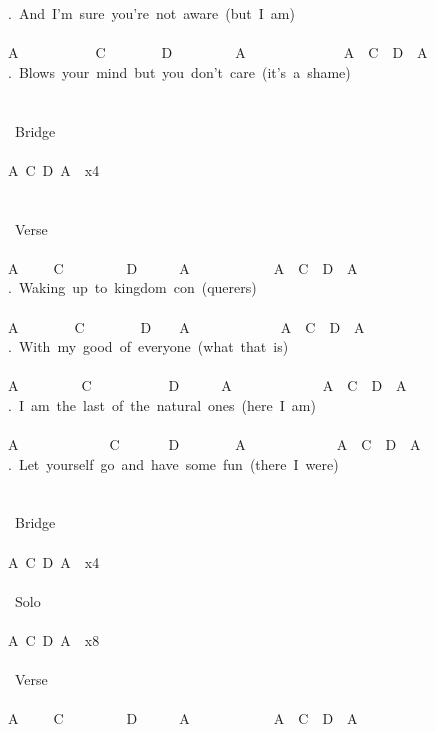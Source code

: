 {.\ And\ I'm\ sure\ you're\ not\ aware\ (but\ I\ am)\\
\\
A\ \ \ \ \ \ \ \ \ \ \ C\ \ \ \ \ \ \ \ D\ \ \ \ \ \ \ \ \ A\ \ \ \ \ \ \ \ \ \ \ \ \ \ A\ \ C\ \ D\ \ A\ \ \\
.\ Blows\ your\ mind\ but\ you\ don't\ care\ (it's\ a\ shame)\\
\\
\\
\lbrack\ Bridge\rbrack\\
\\
A\ C\ D\ A\ \ x4\\
\\
\\
\lbrack\ Verse\rbrack\\
\\
A\ \ \ \ \ C\ \ \ \ \ \ \ \ \ D\ \ \ \ \ \ A\ \ \ \ \ \ \ \ \ \ \ \ A\ \ C\ \ D\ \ A\ \ \\
.\ Waking\ up\ to\ kingdom\ con\ (querers)\\
\\
A\ \ \ \ \ \ \ \ C\ \ \ \ \ \ \ \ D\ \ \ \ A\ \ \ \ \ \ \ \ \ \ \ \ \ A\ \ C\ \ D\ \ A\ \ \\
.\ With\ my\ good\ of\ everyone\ (what\ that\ is)\\
\\
A\ \ \ \ \ \ \ \ \ C\ \ \ \ \ \ \ \ \ \ \ D\ \ \ \ \ \ A\ \ \ \ \ \ \ \ \ \ \ \ \ A\ \ C\ \ D\ \ A\ \ \\
.\ I\ am\ the\ last\ of\ the\ natural\ ones\ (here\ I\ am)\\
\\
A\ \ \ \ \ \ \ \ \ \ \ \ \ C\ \ \ \ \ \ \ D\ \ \ \ \ \ \ \ A\ \ \ \ \ \ \ \ \ \ \ \ \ A\ \ C\ \ D\ \ A\ \ \\
.\ Let\ yourself\ go\ and\ have\ some\ fun\ (there\ I\ were)\\
\\
\\
\lbrack\ Bridge\rbrack\\
\\
A\ C\ D\ A\ \ x4\\
\\
\lbrack\ Solo\rbrack\\
\\
A\ C\ D\ A\ \ x8\\
\\
\lbrack\ Verse\rbrack\\
\ \\
A\ \ \ \ \ C\ \ \ \ \ \ \ \ \ D\ \ \ \ \ \ A\ \ \ \ \ \ \ \ \ \ \ \ A\ \ C\ \ D\ \ A\ \ \\
}
